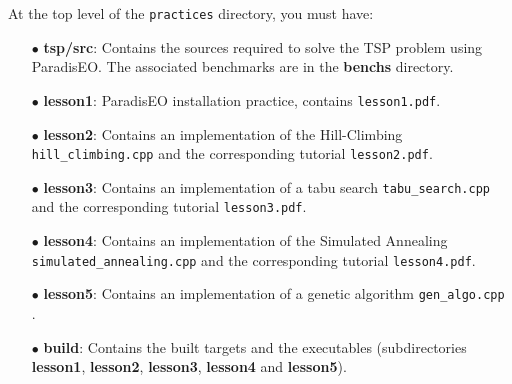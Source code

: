 \documentclass[a4paper]{article}
\begin{document}
    At the top level of the {\tt practices} directory, you must have:
    \begin{itemize}

       \item[$\bullet$] {\bf tsp/src}: Contains the sources required to solve the TSP
       problem using ParadisEO. The associated benchmarks are in the
       {\bf benchs} directory.

         \item[$\bullet$] {\bf lesson1}: ParadisEO installation practice, contains {\tt lesson1.pdf}.

        \item[$\bullet$] {\bf lesson2}: Contains an implementation of the Hill-Climbing
       {\tt hill\_climbing.cpp} and the corresponding tutorial {\tt lesson2.pdf}.

         \item[$\bullet$] {\bf lesson3}: Contains an implementation of a tabu
        search {\tt tabu\_search.cpp} and the corresponding tutorial {\tt lesson3.pdf}.

       \item[$\bullet$] {\bf lesson4}: Contains an implementation of the
      Simulated Annealing {\tt simulated\_annealing.cpp} and the corresponding
      tutorial {\tt lesson4.pdf}.

       \item[$\bullet$] {\bf lesson5}: Contains an implementation of a
      genetic algorithm {\tt gen\_algo.cpp} .

        \item[$\bullet$] {\bf build}: Contains the built targets and
       the executables (subdirectories {\bf lesson1},
        {\bf lesson2}, {\bf lesson3}, {\bf lesson4} and {\bf lesson5}).

    \end{itemize}
\end{document}
